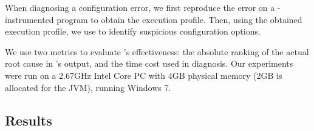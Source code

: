 
When diagnosing a configuration error, we first reproduce the
error on a \ourtool-instrumented program to obtain the
execution profile. Then, using the obtained execution profile, we use \ourtool
to identify suspicious configuration options.


We use two metrics to evaluate \ourtool's effectiveness:
the absolute ranking of the actual root cause in \ourtool's output,
and the time cost used in diagnosis.
Our experiments were run on a
2.67GHz Intel Core PC with 4GB physical memory (2GB is allocated
for the JVM), running Windows 7.


\subsection{Results}
\label{sec:results}

